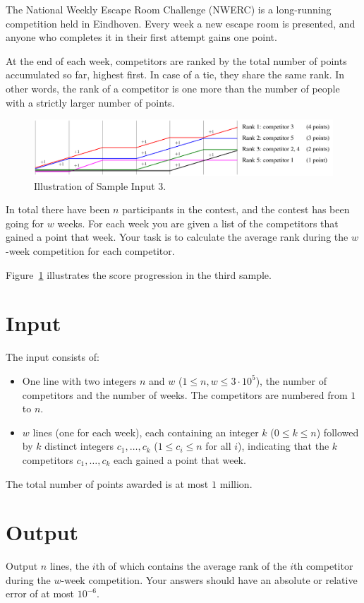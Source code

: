 
The National Weekly Escape Room Challenge (NWERC) is a long-running competition held in Eindhoven.
Every week a new escape room is presented, and anyone who completes it in their first attempt gains one point.

At the end of each week, competitors are ranked by the total number of points accumulated so far, highest first. In case of a
tie, they share the same rank. In other words, the rank of a competitor is one more than the number of people
with a strictly larger number of points.

\begin{figure}[h!]
  \centering
  \includegraphics[width=1.0\textwidth]{ranks}
  \caption{Illustration of Sample Input 3.}
  \label{fig:ranks}
\end{figure}

In total there have been $n$ participants in the contest, and the contest has been going for $w$ weeks.
For each week you are given a list of the competitors that gained a point that week. Your task is to
calculate the average rank during the $w$-week competition for each competitor.

Figure~\ref{fig:ranks} illustrates the score progression in the third sample.

\section*{Input}

The input consists of:
\begin{itemize}
  \item One line with two integers $n$ and $w$ ($1 \le n, w \le 3 \cdot 10^5$), the number of competitors and the number of weeks.  The competitors are numbered from $1$ to $n$.
  \item $w$ lines (one for each week), each containing an integer $k$ ($0 \le k \le n$) followed by $k$ distinct integers $c_1, \ldots, c_k$ ($1 \le c_i \le n$ for
  all $i$), indicating that the $k$ competitors $c_1, \ldots, c_k$ each gained a point that week.
\end{itemize}

The total number of points awarded is at most $1$ million.

\section*{Output}

Output $n$ lines, the $i$th of which contains the average rank of the $i$th competitor during the $w$-week competition.  Your answers should have an absolute or relative error of at most $10^{-6}$.

